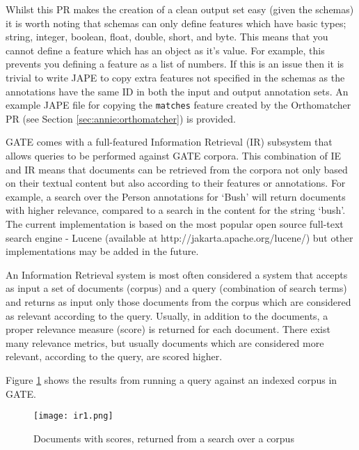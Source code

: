 Whilst this PR makes the creation of a clean output set easy (given the schemas) it is worth
noting that schemas can only define features which have basic types; string, integer, boolean,
float, double, short, and byte. This means that you cannot define a feature which has an object
as it's value. For example, this prevents you defining a feature as a list of numbers. If this is an
issue then it is trivial to write JAPE to copy extra features not specified in the schemas as the 
annotations have the same ID in both the input and output annotation sets. An example JAPE
file for copying the \texttt{matches} feature created by the Orthomatcher PR (see
Section \ref{sec:annie:orthomatcher}) is provided.


GATE comes with a full-featured Information Retrieval (IR) subsystem
that allows queries to be performed against GATE corpora. This
combination of IE and IR means that documents can be retrieved from
the corpora not only based on their textual content but also according
to their features or annotations. For example, a search over the Person
annotations for `Bush' will return documents with higher relevance,
compared to a search in the content for the string `bush'. The current
implementation is based on the most popular open source full-text
search engine - Lucene (available at
http://jakarta.apache.org/lucene/) but other implementations may be
added in the future.

An Information Retrieval system is most often considered a system that
accepts as input a set of documents (corpus) and a query (combination
of search terms) and returns as input only those documents from the
corpus which are considered as relevant according to the
query. Usually, in addition to the documents, a proper relevance
measure (score) is returned for each document. There exist many
relevance metrics, but usually documents which are considered more
relevant, according to the query, are scored higher.

Figure \ref{fig:ir1} shows the results from running a query against an
indexed corpus in GATE.

%
\begin{figure}[htbp]
\begin{center}
\texttt{[image: ir1.png]}
\end{center}
\caption{Documents with scores, returned from a search over a corpus}
\label{fig:ir1}
\end{figure}
%


